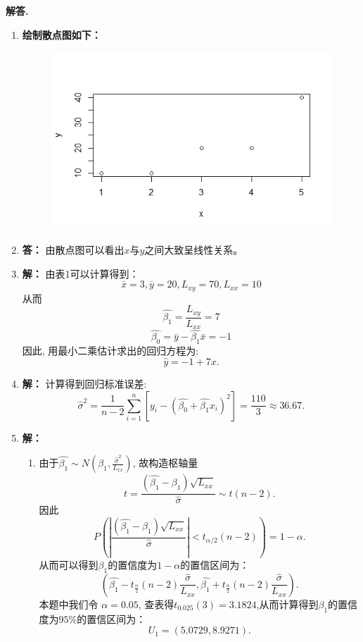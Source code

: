 \documentclass[12pt, a4paper, oneside]{ctexart}
\newenvironment{solution}{\par\noindent\textbf{解答. }}{\par}
\begin{document}
 \begin{solution}
 	
 	\begin{enumerate}
 		\item {\tt}    {\bf 绘制散点图如下：} 
 		\begin{figure}[!h]	
 			\centering	
  			\includegraphics[scale=0.8]{plot1.png}
 			\label{图1}
 		\end{figure}  
 	   
        \item {\tt}    {\bf 答：}  
        由散点图可以看出$x$与$y$之间大致呈线性关系。
       
        \item {\tt}    {\bf 解：} 
        由表1可以计算得到：\[ \bar{x} = 3 ,\bar{y} = 20 ,L_{xy} = 70,  L_{xx} =10\]
        从而\[ \hat{\beta_1}=\frac{L_{xy}}{L_{xx}}= 7\]
        \[ \hat{\beta_0}=\bar{y} - \hat{\beta_1}\bar{x} = -1\]
        因此, 用最小二乘估计求出的回归方程为:
        \[  \hat{y} = -1 + 7 x .\]
        
        \item {\tt}    {\bf 解：} 
        计算得到回归标准误差:\[ \hat{\sigma}^2 = \frac{1}{n-2}\sum_{i=1}^n \left[y_i - (\hat{\beta_0} +\hat{\beta_1}x_i )^2 \right]= \frac{110}{3} \approx 36.67. \]
        
        
        \item {\tt}    {\bf 解：}
          \begin{enumerate}
    
          	  \item {\tt} 由于$\hat{\beta_1}\sim N(\beta_1,\frac{\hat{\sigma}^2}{L_{xx}})$, 故构造枢轴量\[ t = \frac{\left(\hat{\beta_1}-\beta_1\right)\sqrt{L_{xx}}}{\hat{\sigma}} \sim t(n-2).\]
          	 因此\[  P\left(\left| \frac{\left( \hat{\beta_1} - \beta_1 \right) \sqrt{L_{xx}}}{\hat{\sigma}} \right|<t_{\alpha/2}(n-2)\right)=1-\alpha.\]
          	 从而可以得到$\beta_1$的置信度为$1-\alpha$的置信区间为：
          	 \[ \left( \hat{\beta_1}-t_{\frac{\alpha}{2}}(n-2)\frac{\hat{\sigma}}{L_{xx}}, \hat{\beta_1}+t_{\frac{\alpha}{2}}(n-2)\frac{\hat{\sigma}}{L_{xx}}  \right). \]
          	 本题中我们令 $\alpha = 0.05$, 查表得$t_{0.025}(3)=3.1824$,从而计算得到$\beta_1$的置信度为$95\%$的置信区间为：
          	 \[ U_1=(5.0729,8.9271). \]
          

\end{enumerate}
\end{enumerate}
\end{solution}
\end{document}
